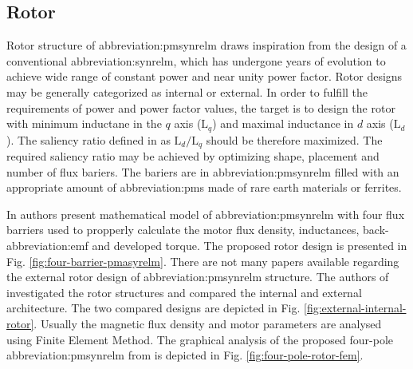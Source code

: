 \documentclass[a4paper, twoside, 11pt]{article}
\begin{document}
    \subsection{Rotor}
    Rotor structure of \gls{abbreviation:pmsynrelm} draws inspiration from the design of a conventional \gls{abbreviation:synrelm}, which has undergone years of evolution to achieve wide range of constant power and near unity power factor. Rotor designs may be generally categorized as internal or external. In order to fulfill the requirements of power and power factor values, the target is to design the rotor with minimum inductane in the $q$ axis ($\text{L}_q$) and maximal inductance in $d$ axis ($\text{L}_d$). The saliency ratio defined in \cite{talebi-Design-of-Permanent-Magnet-Assisted-Synchronous-Reluctance-Motors-Made-Easy} as $\text{L}_d/\text{L}_q$ should be therefore maximized. The required saliency ratio may be achieved by optimizing shape, placement and number of flux bariers. The bariers are in \gls{abbreviation:pmsynrelm} filled with an appropriate amount of \gls{abbreviation:pm}s made of rare earth materials or ferrites. \cite{talebi-Design-of-Permanent-Magnet-Assisted-Synchronous-Reluctance-Motors-Made-Easy}\par
    In \cite{talebi-Design-of-Permanent-Magnet-Assisted-Synchronous-Reluctance-Motors-Made-Easy} authors present mathematical model of \gls{abbreviation:pmsynrelm} with four flux barriers used to propperly calculate the motor flux density, inductances, back-\gls{abbreviation:emf} and developed torque. The proposed rotor design is presented in Fig. \ref{fig:four-barrier-pmasyrelm}. There are not many papers available regarding the external rotor design of \gls{abbreviation:pmsynrelm} structure. The authors of \cite{bonthu-Design-of-permanent-magnet-assisted-synchronous-reluctance-motor-with-external-rotor-architecture} investigated the rotor structures and compared the internal and external architecture. The two compared designs are depicted in Fig. \ref{fig:external-internal-rotor}. Usually the magnetic flux density and motor parameters are analysed using Finite Element Method. The graphical analysis of the proposed four-pole \gls{abbreviation:pmsynrelm} from \cite{talebi-Design-of-Permanent-Magnet-Assisted-Synchronous-Reluctance-Motors-Made-Easy} is depicted in Fig. \ref{fig:four-pole-rotor-fem}.
\end{document}
